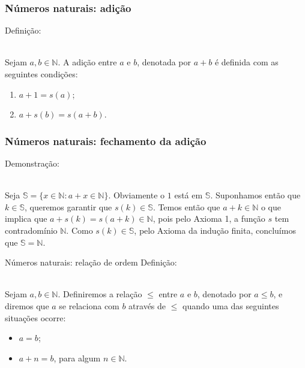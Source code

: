 \documentclass[xcolor=dvipsnames]{beamer}
\begin{document}
\begin{frame}
\frametitle{Números naturais: adição}
    Definição: \\~\
    
    Sejam $a, b \in \mathbb{N}$. A adição entre $a$ e $b$, denotada por $a + b$ é definida com as seguintes condições: 
    \begin{enumerate}
        \item\label{nat-dummySomaMaisUm} $a + 1 = s(a)$;
        \item\label{nat-dummySomaMaisQualquer} $a + s(b) = s(a+b)$.
    \end{enumerate}
\end{frame}

\begin{frame}
\frametitle{Números naturais: fechamento da adição}
    Demonstração: \\~\
    
    Seja $\mathbb{S} = \{ x \in \mathbb{N} : a + x \in \mathbb{N} \}$. Obviamente o $1$ está em $\mathbb{S}$. Suponhamos então que $k \in \mathbb{S}$, queremos  garantir que $s(k) \in \mathbb{S}$. Temos então que $a + k \in \mathbb{N}$ o que implica que $a + s(k) = s(a + k) \in \mathbb{N}$, pois pelo Axioma 1, a função $s$ tem contradomínio $\mathbb{N}$. Como $s(k) \in \mathbb{S}$, pelo Axioma da indução finita, concluímos que $\mathbb{S} = \mathbb{N}$.
\end{frame}



\begin{frame}{Números naturais: relação de ordem}
    Definição: \\~\

    Sejam $a, b \in \mathbb{N}$. Definiremos a relação $\leq$ entre $a$ e $b$, denotado por $a \leq b$, e diremos que $a$ se relaciona com $b$ através de $\leq$ quando uma das seguintes situações ocorre:
    \begin{itemize}
        \item $a = b$;
        \item $a + n = b$, para algum $n \in \mathbb{N}$.
    \end{itemize} 
\end{frame}
\end{document}
